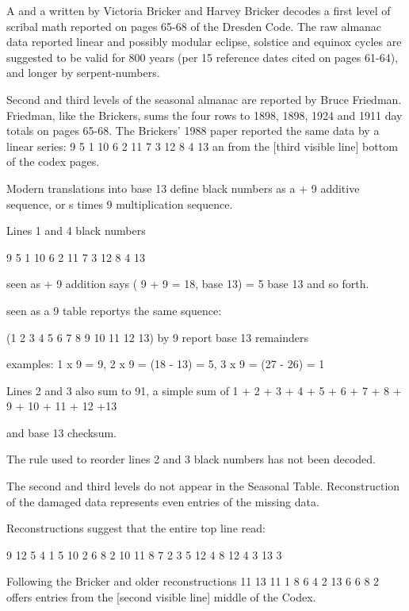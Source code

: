 \documentclass[12pt]{article}
\begin{document}
A  and a  written by Victoria Bricker and Harvey Bricker decodes a first level of scribal math reported on pages 65-68 of the Dresden Code. The raw almanac data reported linear and possibly modular eclipse, solstice and equinox cycles are suggested to be valid for 800 years (per 15 reference dates cited on pages 61-64), and longer by serpent-numbers.

Second and third levels of the seasonal almanac are reported by Bruce Friedman. Friedman, like the Brickers, sums the four rows to 1898, 1898, 1924 and 1911 day totals on pages 65-68.  The Brickers' 1988 paper reported the same data by a linear series: 9 5 1 10 6 2 11 7 3 12 8 4 13 an from the [third visible line] bottom of the codex pages. 

Modern translations into base 13 define black numbers as a + 9 additive sequence, or s times 9 multiplication sequence.
    
    Lines 1 and 4 black numbers 
    
    
    9 5 1 10 6 2 11 7 3 12 8 4 13 
    
    seen  as + 9 addition says ( 9 + 9 = 18, base 13) = 5 base 13 and so forth.
    
    seen as a 9 table reportys the same squence:
    
    (1 2 3 4 5 6 7 8 9 10 11 12 13) by 9 report base 13 remainders 
    
    examples:  1 x 9 = 9, 2 x 9 = (18 - 13) = 5, 3 x 9 = (27 - 26) = 1

Lines 2 and 3 also sum to 91, a simple sum of 1 + 2 + 3 + 4 + 5 + 6 + 7 + 8 + 9 + 10 + 11 + 12 +13

and base 13 checksum. 

The rule used to reorder lines 2 and 3 black numbers has not been decoded.

The second and third levels do not appear in the Seasonal Table. Reconstruction of the damaged data represents even entries of the missing data. 

Reconstructions suggest that the entire top line  read: 

9 12 5 4 1 5 10 2 6 8 2 10 11 8 7 2 3 5 12 4 8 12 4 3 13 3

Following the Bricker and older reconstructions  11 13 11 1 8 6 4 2 13 6 6 8 2 offers entries from the [second visible line] middle of the Codex.
\end{document}

